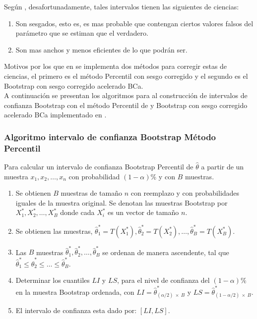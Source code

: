 Según \textcite{balam-2012}, desafortunadamente, tales intervalos tienen las siguientes de ciencias:\\

\begin{enumerate}
\item Son sesgados, esto es, es mas probable que contengan ciertos valores falsos del parámetro que se estiman que el verdadero.

\item Son mas anchos y menos eficientes de lo que podrán ser.
\end{enumerate}

Motivos por los que en \textcite{balam-2012} se implementa dos métodos para corregir estas de ciencias, el primero es el método Percentil con sesgo corregido y el segundo es el Bootstrap con sesgo corregido acelerado BCa.\\


A continuación se presentan los algoritmos para al construcción de intervalos de confianza Bootstrap con el método Percentil de \textcite{efron-1982} y Bootstrap con sesgo corregido acelerado BCa implementado en \textcite{balam-2012}.\\

\subsubsection{Algoritmo intervalo de confianza Bootstrap Método Percentil}

Para calcular un intervalo de confianza Bootstrap Percentil de $\hat{\theta}$ a partir de un muestra $x_{1}, x_{2}, \dots, x_{n}$ con probabilidad $(1-\alpha)$\% y con $B$ muestras.


\begin{enumerate}
\item Se obtienen $B$ muestras de tamaño $n$ con reemplazo y con probabilidades iguales de la muestra original. Se denotan las muestras Bootstrap por $X^{*}_{1}, X^{*}_{2},  \dots, X^{*}_{B}$ donde cada $X^{*}_{i}$ es un vector de tamaño $n$.

\item Se obtienen las muestras, $\hat{\theta}^{*}_{1} = T (X^{*}_{1}) , \hat{\theta}^{*}_{2} = T (X^{*}_{2}), \dots,\hat{\theta}^{*}_{B} = T (X^{*}_{B})$.

\item Las $B$ muestras $\hat{\theta}^{*}_{1}, \hat{\theta}^{*}_{2},\dots, \hat{\theta}^{*}_{B} $ se ordenan de manera ascendente, tal que $\hat{\theta}^{*}_{1} \leq \hat{\theta}^{*}_{2} \leq \dots \leq \hat{\theta}^{*}_{B} $.

\item Determinar los cuantiles $LI$ y $LS$, para el nivel de confianza del $(1-\alpha)$\% en la muestra Bootstrap ordenada, con $LI = \hat{\theta}^{*}_{ ( \alpha/2 ) \: \times \: B} $ y $LS = \hat{\theta}^{*}_{ (1 - \alpha/2) \: \times \: B} $.

\item El intervalo de confianza esta dado por: $[LI, LS]$.
\end{enumerate}





